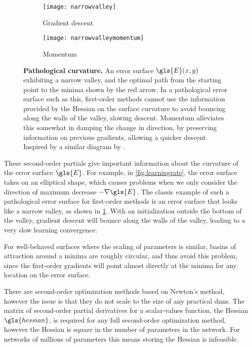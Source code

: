 \documentclass[thesis]{subfiles}
\begin{document}
\begin{figure}[tbp]
\centering
\begin{subfigure}[b]{0.45\textwidth}
\texttt{[image: narrowvalley]}
\caption{Gradient descent}\label{fig:narrowvalleysgd}
\end{subfigure}
\begin{subfigure}[b]{0.45\textwidth}
\texttt{[image: narrowvalleymomentum]}
\caption{Momentum}\label{fig:narrowvalleymomentum}
\end{subfigure}
\caption[Pathological curvature]{\textbf{Pathological curvature.} An error surface $\gls{E}(x, y)$ exhibiting a narrow valley, and the optimal path from the starting point to the minima shown by the red arrow. In a pathological error surface such as this, first-order methods cannot use the information provided by the Hessian on the surface curvature to avoid bouncing along the walls of the valley, slowing descent. Momentum alleviates this somewhat in damping the change in direction, by preserving information on previous gradients, allowing a quicker descent. Inspired by a similar diagram by \citet{martens2010deep}.}
\label{fig:pathological}
\end{figure}
These second-order partials give important information about the curvature of the error surface $\gls{E}$. For example, in \cref{fig:learningrate}, the error surface takes on an elliptical shape, which causes problems when we only consider the direction of maximum decrease $-\nabla \gls{E}$. The classic example of such a pathological error surface for first-order methods is an error surface that looks like a narrow valley, as shown in \cref{fig:narrowvalleysgd}. With an initialization outside the bottom of the valley, gradient descent will bounce along the walls of the valley, leading to a very slow learning convergence.

For well-behaved surfaces where the scaling of parameters is similar,
basins of attraction around a minima are roughly circular, and thus avoid this problem, since the first-order gradients will point almost directly at the minima for any location on the error surface.

There are second-order optimization methods based on Newton's method, however the issue is that they do not scale to the size of any practical \glspl{dnn}. The matrix of second-order partial derivatives for a scalar-values function, the Hessian $\gls{hessian}$, is required for any full second-order optimization method, however the Hessian is square in the number of parameters in the network. For networks of millions of parameters this means storing the Hessian is infeasible.
\end{document}
